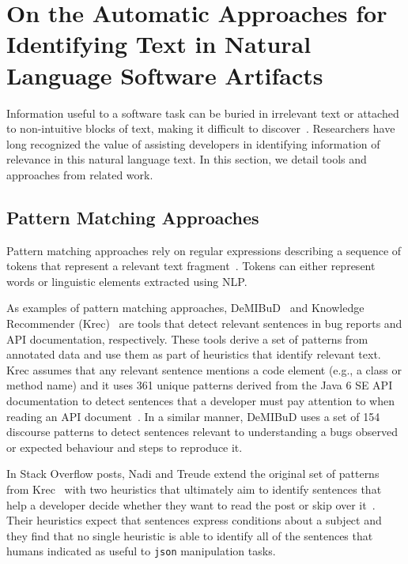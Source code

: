 \section{On the Automatic Approaches for Identifying Text in Natural Language Software Artifacts}
\label{cp2:text-approaches}



Information useful to a software task can be buried in irrelevant text or attached to 
non-intuitive blocks of text, making it difficult to discover~\cite{Robillard2015}.
Researchers have long recognized the value of assisting developers in 
identifying information of relevance in this natural language
text.
In this section, we detail tools and approaches from related work.




\subsection{Pattern Matching Approaches}


Pattern matching approaches rely on regular expressions describing a sequence of tokens that represent a relevant text fragment~\cite{Bavota2016}. Tokens can either represent words or linguistic elements 
extracted using \acf{NLP}.
    
    
As examples  of pattern matching approaches,  {\small DeMIBuD}~\cite{Chaparro2017} and Knowledge Recommender (Krec)~\cite{Maalej2013, Robillard2015} are tools that detect relevant sentences in bug reports and API documentation, respectively. 
These tools derive a set of patterns from annotated data and use them as part of heuristics 
that identify relevant text. Krec assumes that any relevant sentence mentions a 
code element (e.g., a class or method name) and it uses  361 unique patterns derived from the Java 6 SE API documentation to 
detect sentences that a developer must pay attention to when reading an API document~\cite{Robillard2015}.
In a similar manner, {\small DeMIBuD} uses a set of 154 discourse patterns to detect sentences 
relevant to understanding a bugs observed or expected behaviour and steps to reproduce it.





In  Stack Overflow posts, Nadi and Treude  extend the original set of patterns from Krec~\cite{Robillard2015} with two heuristics that ultimately aim to identify sentences that help a developer decide whether they want to read the post or skip over it~\cite{nadi2020}. 
Their heuristics expect that sentences express conditions about a subject and 
they find that no single heuristic is able to identify all of the sentences 
that humans indicated as useful to \texttt{json} manipulation tasks. 







